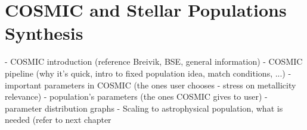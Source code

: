 \chapter{COSMIC and Stellar Populations Synthesis}
- COSMIC introduction (reference Breivik, BSE, general information)
- COSMIC pipeline (why it's quick, intro to fixed population idea, match conditions, ...)
- important parameters in COSMIC (the ones user chooses - stress on metallicity relevance)
- population's parameters (the ones COSMIC gives to user)
    - parameter distribution graphs
- Scaling to astrophysical population, what is needed (refer to next chapter
